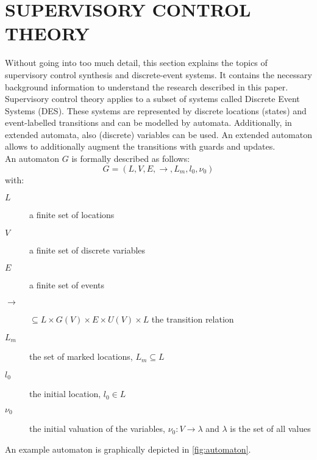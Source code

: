 \section{SUPERVISORY CONTROL THEORY}\label{sec:supervisory_control}
Without going into too much detail, this section explains the topics of supervisory control synthesis and discrete-event systems.
It contains the necessary background information to understand the research described in this paper.\\
Supervisory control theory applies to a subset of systems called Discrete Event Systems (DES).
These systems are represented by discrete locations (states) and event-labelled transitions and can be modelled by automata.
Additionally, in extended automata, also (discrete) variables can be used.
An extended automaton allows to additionally augment the transitions with guards and updates.\\

An automaton \(G\) is formally described as follows:
\begin{equation}
  G = (L,V, E, \rightarrow, L_m , l_0 , \nu_0)
\end{equation}
with:
\begin{description}
  \item[\(L\)] a finite set of locations
  \item[\(V\)] a finite set of discrete variables
  \item[\(E\)] a finite set of events
  \item[\( \rightarrow\)] \(\subseteq L \times G(V) \times E \times U(V ) \times L\) the transition relation
  \item[\( L_m\)] the set of marked locations, \(L_m \subseteq L\)
  \item[\( l_0\)] the initial location, \(l_0 \in L\)
  \item[\( \nu_0\)] the initial valuation of the variables, \(\nu_0:V \rightarrow \lambda\) and \(\lambda\) is the set of all values\\
\end{description}

An example automaton is graphically depicted in \cref{fig:automaton}.\\[2ex]

